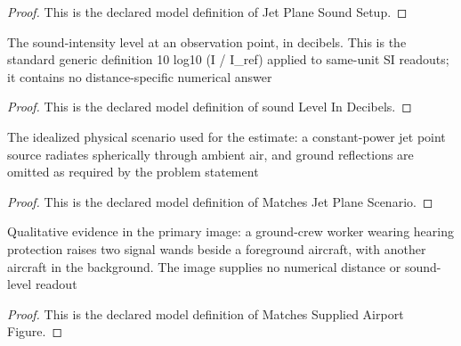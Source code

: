 \begin{proof}
  This is the declared model definition of Jet Plane Sound Setup.
\end{proof}
\begin{definition}
  \label{def:physics:phyx-mini-0212:phyxminiproblems-problemphyxmini0212-soundlevelindecibels}
  The sound-intensity level at an observation point, in decibels. This is the standard generic definition 10 log10 (I / I\_ref) applied to same-unit SI readouts; it contains no distance-specific numerical answer
\end{definition}
\begin{proof}
  This is the declared model definition of sound Level In Decibels.
\end{proof}
\begin{definition}
  \label{def:physics:phyx-mini-0212:phyxminiproblems-problemphyxmini0212-matchesjetplanescenario}
  The idealized physical scenario used for the estimate: a constant-power jet point source radiates spherically through ambient air, and ground reflections are omitted as required by the problem statement
\end{definition}
\begin{proof}
  This is the declared model definition of Matches Jet Plane Scenario.
\end{proof}
\begin{definition}
  \label{def:physics:phyx-mini-0212:phyxminiproblems-problemphyxmini0212-matchessuppliedairportfigure}
  Qualitative evidence in the primary image: a ground-crew worker wearing hearing protection raises two signal wands beside a foreground aircraft, with another aircraft in the background. The image supplies no numerical distance or sound-level readout
\end{definition}
\begin{proof}
  This is the declared model definition of Matches Supplied Airport Figure.
\end{proof}
